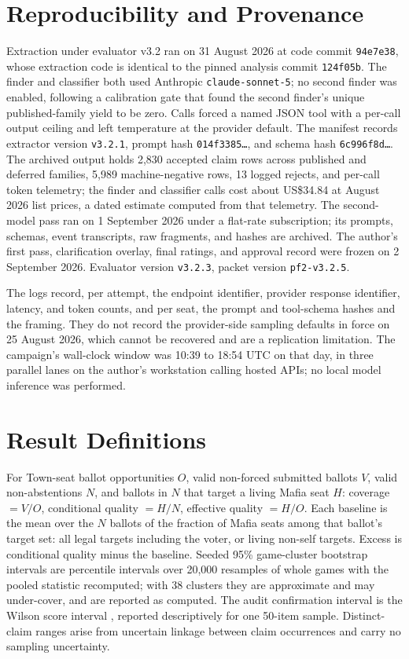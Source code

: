 \documentclass[11pt]{article}
\newcommand{\code}[1]{\texttt{#1}}
\begin{document}
\section{Reproducibility and Provenance}
\label{app:repro}
Extraction under evaluator v3.2 ran on 31 August 2026 at code commit \code{94e7e38}, whose extraction code is identical to the pinned analysis commit \code{124f05b}. The finder and classifier both used Anthropic \code{claude-sonnet-5}; no second finder was enabled, following a calibration gate that found the second finder's unique published-family yield to be zero. Calls forced a named JSON tool with a per-call output ceiling and left temperature at the provider default. The manifest records extractor version \code{v3.2.1}, prompt hash \code{014f3385\ldots}, and schema hash \code{6c996f8d\ldots}. The archived output holds 2,830 accepted claim rows across published and deferred families, 5,989 machine-negative rows, 13 logged rejects, and per-call token telemetry; the finder and classifier calls cost about US\$34.84 at August 2026 list prices, a dated estimate computed from that telemetry. The second-model pass ran on 1 September 2026 under a flat-rate subscription; its prompts, schemas, event transcripts, raw fragments, and hashes are archived. The author's first pass, clarification overlay, final ratings, and approval record were frozen on 2 September 2026. Evaluator version \code{v3.2.3}, packet version \code{pf2-v3.2.5}.

The logs record, per attempt, the endpoint identifier, provider response identifier, latency, and token counts, and per seat, the prompt and tool-schema hashes and the framing. They do not record the provider-side sampling defaults in force on 25 August 2026, which cannot be recovered and are a replication limitation. The campaign's wall-clock window was 10:39 to 18:54 UTC on that day, in three parallel lanes on the author's workstation calling hosted APIs; no local model inference was performed.

\section{Result Definitions}
\label{app:defs}
For Town-seat ballot opportunities $O$, valid non-forced submitted ballots $V$, valid non-abstentions $N$, and ballots in $N$ that target a living Mafia seat $H$: coverage $=V/O$, conditional quality $=H/N$, effective quality $=H/O$. Each baseline is the mean over the $N$ ballots of the fraction of Mafia seats among that ballot's target set: all legal targets including the voter, or living non-self targets. Excess is conditional quality minus the baseline. Seeded 95\% game-cluster bootstrap intervals are percentile intervals over 20,000 resamples of whole games with the pooled statistic recomputed; with 38 clusters they are approximate and may under-cover, and are reported as computed. The audit confirmation interval is the Wilson score interval \citep{wilson1927interval}, reported descriptively for one 50-item sample. Distinct-claim ranges arise from uncertain linkage between claim occurrences and carry no sampling uncertainty.
\end{document}
